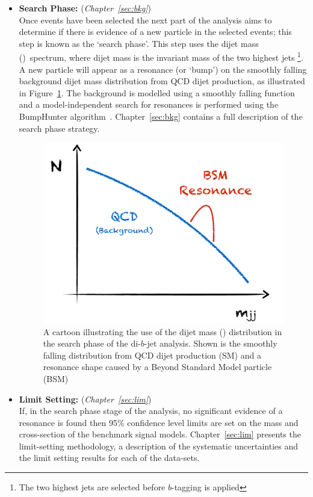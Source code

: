 \begin{itemize}[leftmargin=*]
\item\textbf{Search Phase:} (\textit{Chapter~\ref{sec:bkg}})\\
  Once events have been selected the next part of the analysis aims to determine if there
  is evidence of a new particle in the selected events; this step is known as the `search phase'.
  This step uses the dijet mass (\mjj)~spectrum, where dijet mass is the invariant mass of the two highest \pT{} jets
  \footnote{The two highest \pT{} jets are selected before $b$-tagging is applied}.
  A new particle will appear as a resonance (or `bump') on the smoothly falling background
  dijet mass distribution from QCD dijet production, as illustrated in Figure~\ref{fig:evt-dijet_schem}.
  The background is modelled using a smoothly falling function and a
  model-independent search for resonances is performed using the {\sc BumpHunter} algorithm~\cite{dibjet-bh}.
  Chapter~\ref{sec:bkg} contains a full description of the search phase strategy.
  \vspace{-2mm}
  \begin{figure}[!hbt]
  \begin{center}
    \includegraphics[width=0.6\linewidth, angle=0]{figs/Dibjet/Gen/dijet_schem.pdf}
  \end{center}
  \vspace{-3mm}
  \caption{A cartoon illustrating the use of the dijet mass (\mjj) distribution in the search phase of the di-$b$-jet analysis.
            Shown is the smoothly falling distribution from QCD dijet production (SM)
            and a resonance shape caused by a Beyond Standard Model particle (BSM)}
          \label{fig:evt-dijet_schem}
  \end{figure}
  \vspace{-5mm}
 
\item\textbf{Limit Setting:} (\textit{Chapter~\ref{sec:lim}})\\
  If, in the search phase stage of the analysis, no significant evidence of a resonance is found
  then 95\% confidence level limits are set on the mass and cross-section of the benchmark signal models.
  Chapter~\ref{sec:lim} presents the limit-setting methodology,
  a description of the systematic uncertainties
  and the limit setting results for each of the data-sets.

\end{itemize}

